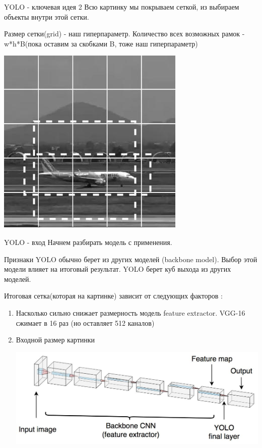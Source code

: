 \documentclass[notes,12pt, aspectratio=169]{beamer}
\begin{document}
\begin{frame}{YOLO - ключевая идея 2}
Всю картинку мы покрываем сеткой, из выбираем объекты внутри этой сетки. 

Размер сетки(grid) - наш гиперпараметр. Количество всех возможных рамок - w*h*B(пока оставим за скобками B, тоже наш гиперпараметр)

\begin{center}
	\includegraphics[width=.4\linewidth]{boxes.jpg}
\end{center}
\end{frame}

\begin{frame}{YOLO - вход}
	Начнем разбирать модель с применения.
	
Признаки YOLO обычно берет из других моделей (backbone model). Выбор этой модели влияет на итоговый результат. YOLO берет куб выхода из других моделей.

Итоговая сетка(которая на картинке) зависит от следующих факторов :
	\begin{enumerate}
	\item Насколько сильно снижает размерность модель feature extractor. VGG-16 сжимает в 16 раз (но оставляет 512 каналов)
	\item Входной размер картинки
	
	\begin{center}
	\includegraphics[width=.6\linewidth]{backbone.jpg}
\end{center}
\end{enumerate}

\end{frame}
\end{document}
